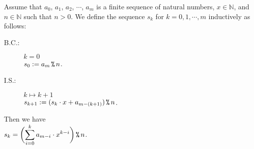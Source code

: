 \begin{Theorem}
   Assume that $a_0$, $a_1$, $a_2$, $\cdots$, $a_m$ is a finite sequence of natural numbers, $x \in \mathbb{N}$,
   and $n\in \mathbb{N}$ such that $n > 0$.
   We define the sequence $s_k$ for $k=0,1,\cdots,m$ inductively as follows:
   \begin{description}
   \item[B.C.:] $k = 0$
             \\[0.2cm]
             \hspace*{1.3cm}
             $s_0 := a_m \,\texttt{\%}\, n$.
   \item[I.S.:] $k \mapsto k + 1$
             \\[0.2cm]
             \hspace*{1.3cm}
             $s_{k+1}:= (s_k \cdot x + a_{m - (k + 1)}) \,\texttt{\%}\, n$.
   \end{description}
   Then we have 
   \\[0.2cm]
   \hspace*{1.3cm}
   $\displaystyle s_k = \biggl(\sum\limits_{i=0}^k a_{m - i} \cdot x^{k - i}\biggr) \,\texttt{\%}\, n$.
\end{Theorem}

